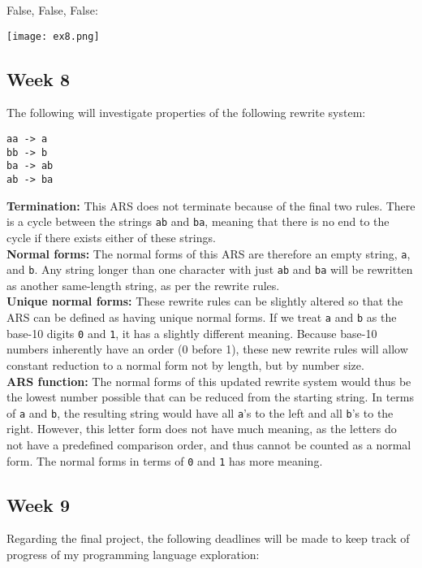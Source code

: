 \documentclass{article}
\theoremstyle{theorem}
\theoremstyle{definition}
\theoremstyle{remark}
\begin{document}
False, False, False:
\begin{center}
    \texttt{[image: ex8.png]}
\end{center}
\newpage
\subsection{Week 8}
The following will investigate properties of the following rewrite system:
\begin{lstlisting}
aa -> a
bb -> b
ba -> ab
ab -> ba
\end{lstlisting}

\noindent \textbf{Termination: } This ARS does not terminate because of the final two rules. There is a cycle between the strings \texttt{ab} and \texttt{ba}, meaning that there is no end to the cycle if there exists either of these strings.\\

\noindent \textbf{Normal forms: } The normal forms of this ARS are therefore an empty string, \texttt{a}, and \texttt{b}. Any string longer than one character with just \texttt{ab} and \texttt{ba} will be rewritten as another same-length string, as per the rewrite rules.\\

\noindent \textbf{Unique normal forms: } These rewrite rules can be slightly altered so that the ARS can be defined as having unique normal forms. If we treat \texttt{a} and \texttt{b} as the base-10 digits \texttt{0} and \texttt{1}, it has a slightly different meaning. Because base-10 numbers inherently have an order (0 before 1), these new rewrite rules will allow constant reduction to a normal form not by length, but by number size.\\

\noindent \textbf{ARS function: } The normal forms of this updated rewrite system would thus be the lowest number possible that can be reduced from the starting string. In terms of \texttt{a} and \texttt{b}, the resulting string would have all \texttt{a}'s to the left and all \texttt{b}'s to the right. However, this letter form does not have much meaning, as the letters do not have a predefined comparison order, and thus cannot be counted as a normal form. The normal forms in terms of \texttt{0} and \texttt{1} has more meaning.
\subsection{Week 9}
Regarding the final project, the following deadlines will be made to keep track of progress of my programming language exploration:\\
\end{document}
